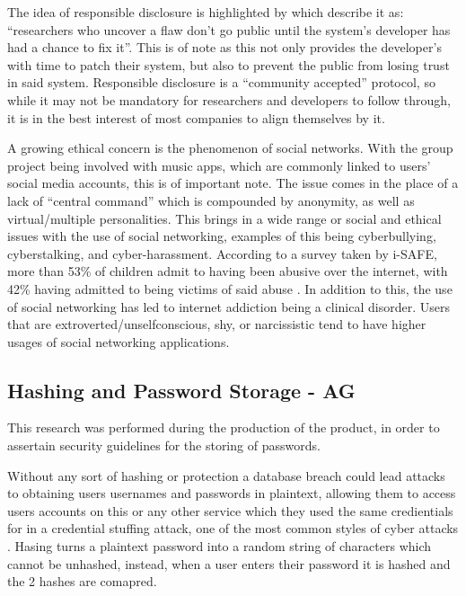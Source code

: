\documentclass[10pt, notitlepage]{report}
\begin{document}
The idea of responsible disclosure is highlighted by \cite{2010a} which describe it as: “researchers who uncover a flaw don't go public until the system's developer has had a chance to fix it”.  This is of note as this not only provides the developer’s with time to patch their system, but also to prevent the public from losing trust in said system.  Responsible disclosure is a “community accepted” protocol, so while it may not be mandatory for researchers and developers to follow through, it is in the best interest of most companies to align themselves by it.

A growing ethical concern is the phenomenon of social networks.  With the group project being involved with music apps, which are commonly linked to users’ social media accounts, this is of important note.  The issue comes in the place of a lack of “central command” which is compounded by anonymity, as well as virtual/multiple personalities.  This brings in a wide range or social and ethical issues with the use of social networking, examples of this being cyberbullying, cyberstalking, and cyber-harassment.  According to a survey taken by i-SAFE, more than 53\% of children admit to having been abusive over the internet, with 42\% having admitted to being victims of said abuse \cite{iSAFE2004}. In addition to this, the use of social networking has led to internet addiction being a clinical disorder.  Users that are extroverted/unselfconscious, shy, or narcissistic \cite{Kizza2016} tend to have higher usages of social networking applications.  


\subsection{Hashing and Password Storage - AG}
\label{res:passsec}

This research was performed during the production of the product, in order to assertain security guidelines for the storing of passwords.\newline

Without any sort of hashing or protection a database breach could lead attacks to obtaining users usernames and passwords in plaintext, allowing them to access users accounts on this or any other service which they used the same credientials for in a credential stuffing attack, one of the most common styles of cyber attacks \cite{OWASP2020}. Hasing turns a plaintext password into a random string of characters which cannot be unhashed, instead, when a user enters their password it is hashed and the 2 hashes are comapred.
\end{document}
